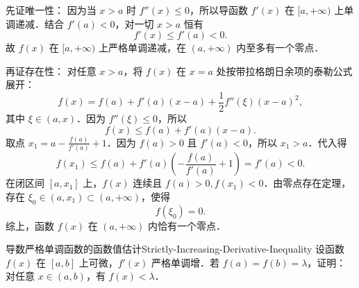 \begin{myproof}
    先证唯一性：
    因为当 $x > a$ 时 $f''(x) \leqslant 0$，所以导函数 $f'(x)$ 在 $[a, +\infty)$ 上单调递减．结合 $f'(a) < 0$，对一切 $x > a$ 恒有
    \begin{equation}
        f'(x) \leqslant f'(a) < 0.
    \end{equation}
    故 $f(x)$ 在 $[a, +\infty)$ 上严格单调递减，在 $(a, +\infty)$ 内至多有一个零点．

    再证存在性：
    对任意 $x > a$，将 $f(x)$ 在 $x = a$ 处按带拉格朗日余项的泰勒公式展开：
    \begin{equation}
        f(x) = f(a) + f'(a)(x - a) + \frac{1}{2}f''(\xi)(x - a)^2,
    \end{equation}
    其中 $\xi \in (a, x)$．因为 $f''(\xi) \leqslant 0$，所以
    \begin{equation}
        f(x) \leqslant f(a) + f'(a)(x - a).
    \end{equation}
    取点 $x_1 = a - \frac{f(a)}{f'(a)} + 1$．因为 $f(a) > 0$ 且 $f'(a) < 0$，所以 $x_1 > a$．代入得
    \begin{equation}
        f(x_1) \leqslant f(a) + f'(a)\left( -\frac{f(a)}{f'(a)} + 1 \right) = f'(a) < 0.
    \end{equation}
    在闭区间 $[a, x_1]$ 上，$f(x)$ 连续且 $f(a) > 0, f(x_1) < 0$．由零点存在定理，存在 $\xi_0 \in (a, x_1) \subset (a, +\infty)$，使得
    \begin{equation}
        f(\xi_0) = 0.
    \end{equation}
    综上，函数 $f(x)$ 在 $(a, +\infty)$ 内恰有一个零点．
\end{myproof}

\begin{problem}{导数严格单调函数的函数值估计}{Strictly-Increasing-Derivative-Inequality}
    设函数 $f(x)$ 在 $[a, b]$ 上可微，$f'(x)$ 严格单调增．若 $f(a) = f(b) = \lambda$，证明：对任意 $x \in (a, b)$，有 $f(x) < \lambda$．
\end{problem}


